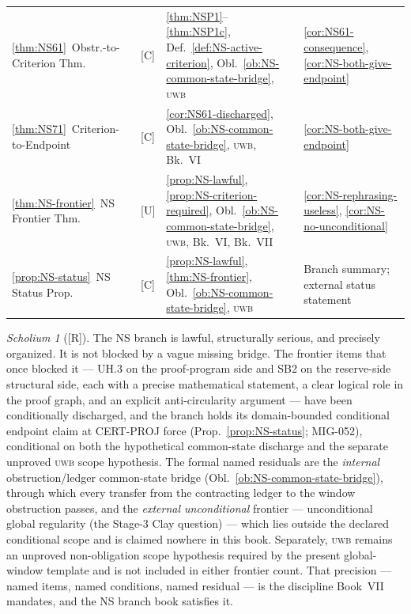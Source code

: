 \documentclass[12pt,oneside]{amsbook}
\theoremstyle{plain}
\theoremstyle{definition}
\theoremstyle{remark}
\newtheorem{scholium}[theorem]{Scholium}
\newcommand{\status}[1]{\textup{[#1]}}
\begin{document}
\begin{tabular}{@{}p{3.8cm}p{0.8cm}p{3.2cm}p{5.2cm}@{}}
\ref{thm:NS61}\ Obstr.-to-Criterion Thm.
 & [C] & \ref{thm:NSP1}--\ref{thm:NSP1c},
 Def.~\ref{def:NS-active-criterion},
 Obl.~\ref{ob:NS-common-state-bridge}, \textsc{uwb}
 & \ref{cor:NS61-consequence}, \ref{cor:NS-both-give-endpoint} \\

\ref{thm:NS71}\ Criterion-to-Endpoint
 & [C] & \ref{cor:NS61-discharged},
 Obl.~\ref{ob:NS-common-state-bridge}, \textsc{uwb}, Bk.~VI
 & \ref{cor:NS-both-give-endpoint} \\

\ref{thm:NS-frontier}\ NS Frontier Thm.
 & [U] & \ref{prop:NS-lawful}, \ref{prop:NS-criterion-required},
 Obl.~\ref{ob:NS-common-state-bridge}, \textsc{uwb}, Bk.~VI, Bk.~VII
 & \ref{cor:NS-rephrasing-useless}, \ref{cor:NS-no-unconditional} \\

\ref{prop:NS-status}\ NS Status Prop.
 & [C] & \ref{prop:NS-lawful}, \ref{thm:NS-frontier},
 Obl.~\ref{ob:NS-common-state-bridge}, \textsc{uwb}
 & Branch summary; external status statement \\
\hline
\end{tabular}
\renewcommand{\arraystretch}{1}

\medskip

\begin{scholium}[\status{R}]\label{sch:NS-final}
The NS branch is lawful, structurally serious, and precisely
organized. It is not blocked by a vague missing bridge. The
frontier items that once blocked it --- UH.3 on the proof-program
side and SB2 on the reserve-side structural side, each with a
precise mathematical statement, a clear logical role in the proof
graph, and an explicit anti-circularity argument --- have been
conditionally discharged, and the branch holds its domain-bounded
conditional endpoint claim at CERT-PROJ force
(Prop.~\ref{prop:NS-status}; MIG-052), conditional on both the
hypothetical common-state discharge and the separate unproved
\textsc{uwb} scope hypothesis. The formal named residuals are the
\emph{internal} obstruction/ledger
common-state bridge (Obl.~\ref{ob:NS-common-state-bridge}), through
which every transfer from the contracting ledger to the window
obstruction passes, and the \emph{external unconditional} frontier
--- unconditional global regularity (the Stage-3 Clay question) ---
which lies outside the declared conditional scope and is claimed
nowhere in this book. Separately, \textsc{uwb} remains an unproved
non-obligation scope hypothesis required by the present global-window
template and is not included in either frontier count.
That precision --- named items, named conditions, named residual ---
is the discipline Book~VII mandates, and the NS branch book
satisfies it.
\end{scholium}
\end{document}
